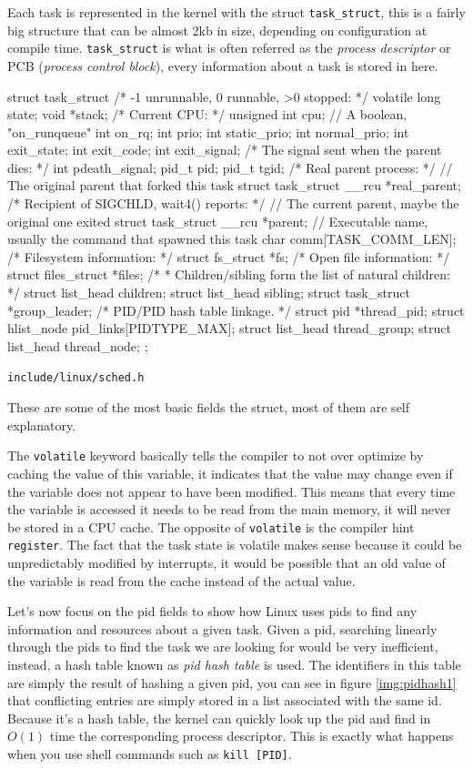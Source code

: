 \documentclass[10pt]{book}
\begin{document}
Each task is represented in the kernel with the struct \verb|task_struct|, this is a fairly big structure that can be almost 2kb in size, depending on configuration at compile time. \verb|task_struct| is what is often referred as the \textit{process descriptor} or PCB (\textit{process control block}), every information about a task is stored in here. 
\begin{code}
struct task_struct {
	/* -1 unrunnable, 0 runnable, >0 stopped: */
	volatile long			state;
	void				*stack;
	/* Current CPU: */
	unsigned int			cpu;
	// A boolean, "on_runqueue"
	int				on_rq; 
	int				prio;
	int				static_prio;
	int				normal_prio;
        int				exit_state;
	int				exit_code;
	int				exit_signal;
	/* The signal sent when the parent dies: */
	int				pdeath_signal;
	pid_t				pid;
	pid_t				tgid;
        /* Real parent process: */
        // The original parent that forked this task
	struct task_struct __rcu	*real_parent;
	/* Recipient of SIGCHLD, wait4() reports: */
	// The current parent, maybe the original one exited
	struct task_struct __rcu	*parent;
	// Executable name, usually the command that spawned this task
	char				comm[TASK_COMM_LEN]; 
        /* Filesystem information: */
	struct fs_struct		   *fs;
	/* Open file information: */
	struct files_struct		*files;
	/*
	 * Children/sibling form the list of natural children:
	 */
	struct list_head		children;
	struct list_head		sibling;
	struct task_struct	   *group_leader;
	/* PID/PID hash table linkage. */
	struct pid			*thread_pid;
	struct hlist_node	   pid_links[PIDTYPE_MAX];
	struct list_head		thread_group;
	struct list_head		thread_node;
};
\end{code}
\verb|include/linux/sched.h|

These are some of the most basic fields the struct, most of them are self explanatory.

The \verb|volatile| keyword basically tells the compiler to not over optimize by caching the value of this variable, it indicates that the value may change even if the variable does not appear to have been modified. This means that every time the variable is accessed it needs to be read from the main memory, it will never be stored in a CPU cache. The opposite of \verb|volatile| is the compiler hint \verb|register|. The fact that the task state is volatile makes sense because it could be unpredictably modified by interrupts, it would be possible that an old value of the variable is read from the cache instead of the actual value.

Let's now focus on the pid fields to show how Linux uses pids to find any information and resources about a given task. Given a pid, searching linearly through the pids to find the task we are looking for would be very inefficient, instead, a hash table known as \textit{pid hash table} is used. The identifiers in this table are simply the result of hashing a given pid, you can see in figure \ref{img:pidhash1} that conflicting entries are simply stored in a list associated with the same id. Because it's a hash table, the kernel can quickly look up the pid and find in $O(1)$ time the corresponding process descriptor. This is exactly what happens when you use shell commands such as \verb|kill [PID]|.
\end{document}
